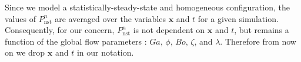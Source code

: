 Since we model a statistically-steady-state and homogeneous configuration, the values of $P_\text{nst}^n$ are averaged over the variables $\mathbf{x}$ and $t$ for a given simulation. 
Consequently, for our concern, $P_\text{nst}^n$ is not dependent on $\mathbf{x}$ and $t$, but remains a function of the global flow parameters :  $Ga$, $\phi$, $Bo$, $\zeta$, and $\lambda$.
Therefore from now on we drop $\mathbf{x}$ and $t$ in our notation. 